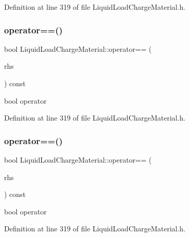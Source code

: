 Definition at line 319 of file Liquid\+Load\+Charge\+Material.\+h.

\mbox{\label{class_liquid_load_charge_material_ad2090d1628f26e46339e9e164b47d3a2}} 
\subsubsection{\texorpdfstring{operator==()}{operator==()}\hspace{0.1cm}{\footnotesize\ttfamily [2/3]}}
{\footnotesize\ttfamily bool Liquid\+Load\+Charge\+Material\+::operator== (\begin{DoxyParamCaption}\item[{const \hyperlink{class_liquid_load_charge_material}{Liquid\+Load\+Charge\+Material} \&}]{rhs }\end{DoxyParamCaption}) const\hspace{0.3cm}{\ttfamily [inline]}}

bool operator 

Definition at line 319 of file Liquid\+Load\+Charge\+Material.\+h.

\mbox{\label{class_liquid_load_charge_material_ad2090d1628f26e46339e9e164b47d3a2}} 
\subsubsection{\texorpdfstring{operator==()}{operator==()}\hspace{0.1cm}{\footnotesize\ttfamily [3/3]}}
{\footnotesize\ttfamily bool Liquid\+Load\+Charge\+Material\+::operator== (\begin{DoxyParamCaption}\item[{const \hyperlink{class_liquid_load_charge_material}{Liquid\+Load\+Charge\+Material} \&}]{rhs }\end{DoxyParamCaption}) const\hspace{0.3cm}{\ttfamily [inline]}}

bool operator 

Definition at line 319 of file Liquid\+Load\+Charge\+Material.\+h.

